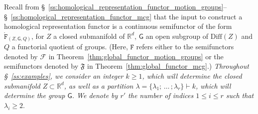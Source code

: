 \documentclass[AHL,Unicode,published]{cedram}
\newcommand{\Diff}{\mathrm{Diff}}
\newcommand{\Int}{\mathring}
\newcommand{\fF}{\mathfrak{F}}
\newcommand{\tF}{\mathtt{F}}
\newcommand{\sG}{\mathsf{G}}
\newcommand{\cF}{\mathcal{F}}
\newcommand{\bR}{\mathbb{R}}
\renewcommand{\geq}{\geqslant}
\renewcommand{\leq}{\leqslant}
\begin{document}
Recall from \S~\ref{ss:homological_representation_functor_motion_groups}--\S~\ref{ss:homological_representation_functor_mcg} that the input to construct a homological representation functor is a continuous semifunctor of the form $\Int{\tF}_{(Z,\sG,Q)}$, for $Z$ a closed submanifold of $\bR^d$, $\sG$ an open subgroup of $\Diff(Z)$ and $Q$ a functorial quotient of groups. (Here, $\tF$ refers either to the semifunctors denoted by $\cF$ in Theorem~\ref{thm:global_functor_motion_groups} or the semifunctors denoted by $\fF$ in Theorem~\ref{thm:global_functor_mcg}.)
\emph{Throughout \S~\ref{ss:examples}, we consider an integer $k\geq 1$, which will determine the closed submanifold $Z \subset \bR^d$, as well as a partition $\lambda = \boldsymbol{\{} \lambda_{1};\,\ldots\,;\lambda_{r} \boldsymbol{\}} \vdash k$, which will determine the group $\sG$. We denote by $r'$ the number of indices $1\leq i \leq r$ such that $\lambda_i \geq 2$}.
\end{document}
